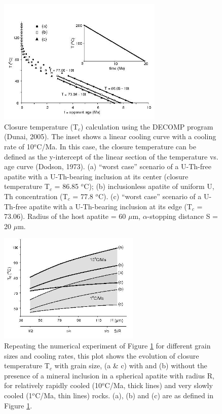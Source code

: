 \documentclass{article}
\begin{document}
\begin{figure}[htbp]
  \centering
  \includegraphics[width=0.7\textwidth]{Tt10KMa60um2.jpg}
  \caption{
    Closure temperature  (T$_c$) calculation using  the DECOMP program
    (Dunai,  2005).  The  inset shows  a linear  cooling curve  with a
    cooling rate of 10$^o$C/Ma.  In this case, the closure temperature
    can be  defined as  the y-intercept of  the linear section  of the
    temperature  vs.  age  curve (Dodson,  1973).  (a)  ``worst case''
    scenario of  a U-Th-free apatite with a  U-Th-bearing inclusion at
    its  center  (closure  temperature   T$_c$  =  86.85  $^o$C);  (b)
    inclusionless apatite of uniform U, Th concentration (T$_c$ = 77.8
    $^o$C).  (c) ``worst case'' scenario of a U-Th-free apatite with a
    U-Th-bearing inclusion at its edge (T$_c$ = 73.06).  Radius of the
    host  apatite  = 60  $\mu$m,  $\alpha$-stopping  distance  S =  20
    $\mu$m.}
  \label{fig:Tt}
\end{figure}

\begin{figure}[htbp]
  \centering \includegraphics[width=0.6\textwidth]{Tc2.jpg}
  \caption{
    Repeating  the  numerical experiment  of  Figure \ref{fig:Tt}  for
    different  grain sizes  and  cooling rates,  this  plot shows  the
    evolution of closure  temperature T$_c$ with grain size,  (a \& c)
    with  and (b) without  the presence  of a  mineral inclusion  in a
    spherical  apatite with  radius R,  for relatively  rapidly cooled
    (10$^o$C/Ma, thick lines) and  very slowly cooled (1$^o$C/Ma, thin
    lines)  rocks.  (a),  (b)  and   (c)  are  as  defined  in  Figure
    \ref{fig:Tt}.}
  \label{fig:Tc}
\end{figure}
\end{document}
